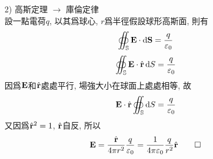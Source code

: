\begin{solve}
\begin{itemize}
        \item[2)] 高斯定理 $\rightarrow$ 庫倫定律\\
              設一點電荷$q$, 以其爲球心, $r$爲半徑假設球形高斯面, 則有
              $$\oiint_{\mathbb{S}} \mathbf{E} \cdot \mathop{}\!\mathrm{d}\mathbf{S} = \frac{q}{\varepsilon_0}$$
              $$\oiint_{\mathbb{S}} \mathbf{E} \cdot \hat{\mathbf{r}} \mathop{}\!\mathrm{d} S = \frac{q}{\varepsilon_0}$$
              因爲$\mathbf{E}$和$\hat{\mathbf{r}}$處處平行, 場強大小在球面上處處相等, 故
              $$\mathbf{E} \cdot \hat{\mathbf{r}} \oiint_{\mathbb{S}} \mathop{}\!\mathrm{d} S = \frac{q}{\varepsilon_0}$$
              又因爲$\hat{\mathbf{r}}^2 = 1$, $\hat{\mathbf{r}}$自反, 所以
              \begin{equation*}
                  \mathbf{E} = \frac{\hat{\mathbf{r}}}{4\pi r^2}\frac{q}{\varepsilon_0} = \frac{1}{4\pi\varepsilon_0}\frac{q}{r^2}\hat{\mathbf{r}} \qedhere
              \end{equation*}
    \end{itemize}
\end{solve}